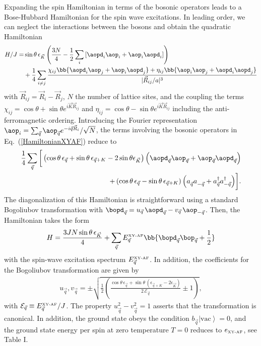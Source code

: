 Expanding the spin Hamiltonian in terms of the bosonic operators leads to a Bose-Hubbard Hamiltonian for the spin wave excitations.
In leading order, we can neglect the interactions between the bosons and obtain the quadratic Hamiltonian
%
\begin{align} \label{HamiltonianXYAF}
H/J = &\sin \theta \, \epsilon_{\vec K} \left(\frac{3 N}{4} - \frac{1}{2}\sum_i\left[\aopd_{i}\aop_i+ \aop_i \aopd_{i}\right]\right) \\
           &+  \frac{1}{4} \sum_{i\ne j} \frac{
    \chi_{i j} \bb{ \aopd_{i} \aop_{j}  + \aop_{i} \aopd_{j} }
  + \eta_{i j} \bb{ \aop_{i} \aop_{j}  + \aopd_{i} \aopd_{j} }
}{|{\vec R}_{ij}/a|^3}
\end{align}
with  ${\vec R}_{ij}={\vec R}_i - {\vec R}_j$,  $N$ the number of lattice sites, and the coupling the terms
$\chi_{i j}=\cos\theta+\sin\theta e^{i {\vec K} {\vec R}_{ij}}$ and $\eta_{i j}=\cos\theta-\sin\theta e^{i {\vec K} {\vec R}_{ij}}$ including the
 anti-ferromagnetic ordering.
Introducing the  Fourier representation $\aop_i =  \sum_{\vec q} \aop_{\vec q}e^{-i {\vec q} {\vec R}_i}/\sqrt{N}$,
the terms involving the bosonic operators in Eq.~(\ref{HamiltonianXYAF}) reduce to
%
\begin{align}
\frac{1}{4} \sum_{\vec q} \bigg[
\left( \cos\theta \, \epsilon_{\vec q} +\sin\theta \, \epsilon_{\vec q+K} - 2 \sin \theta \epsilon_{\vec K}\right)\Big(\aopd_{\vec q} \aop_{\vec q}  + \aop_{\vec q} \aopd_{\vec q}\Big) \\
+\left( \cos\theta \, \epsilon_{\vec q}-\sin\theta \, \epsilon_{\vec q+K} \right)\Big(a^{\phantom\dag}_{\vec q} a^{\phantom\dag}_{-\vec q}
+ a^{\dag}_{\vec q} a^{\dag}_{-{\vec q}} \Big) \bigg].
\end{align}
%
The diagonalization of this Hamiltonian is straightforward using a standard Bogoliubov transformation
with $\bopd_{\vec q} = u_{\vec q}\, \aopd_{\vec q} - v_{\vec q}\, \aop_{-\vec q}$.
Then, the Hamiltonian takes the form
%
\begin{align} \label{Hdiagonal}
H = \frac{3J N \sin \theta\, \epsilon_{\vec K}}{4}  + \sum_{\vec q} E^{\mbox{\tiny XY-AF}}_{\vec q} \bb{\bopd_{\vec q}\bop_{\vec q} + \frac{1}{2}}
\end{align}
%
with the spin-wave excitation spectrum $E^{\mbox{\tiny XY-AF}}_{\vec q}$. In addition, the coefficients  for the Bogoliubov transformation
are given by
%
\begin{align}
u_{\vec q} , v_{\vec q} = \pm\sqrt{\frac{1}{2} \left( \frac{\cos\theta \, \epsilon_{\vec q} +\sin\theta \, (\epsilon_{\vec q+K} - 2 \epsilon_{\vec K})}{2\, \mathcal{E}_{\vec q}}\pm 1\right)},
\end{align}
%
with $\mathcal{E}_{\vec q} \equiv E^{\mbox{\tiny XY-AF}}_{\vec q} / J $.
The property $u^2_{\vec q}-v^2_{\vec q}=1$ asserts that the transformation is canonical.
In addition, the ground state obeys the condition $b_{\vec q} \left|\text{vac}\right\rangle = 0$, and the ground state energy per spin at zero temperature $T=0$
reduces to $e_{\mbox{\tiny XY-AF}}$, see Table I.


